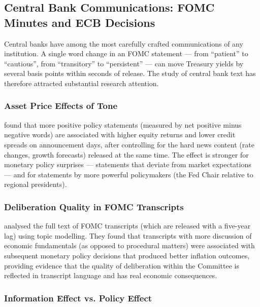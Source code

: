 \subsection{Central Bank Communications: FOMC Minutes and ECB Decisions}
\label{sec:ch09-central-bank-communications}

Central banks have among the most carefully crafted communications of any institution. A single word change in an FOMC statement --- from ``patient'' to ``cautious'', from ``transitory'' to ``persistent'' --- can move Treasury yields by several basis points within seconds of release. The study of central bank text has therefore attracted substantial research attention.

\subsubsection*{Asset Price Effects of Tone}

\citet{schmeling2019does} found that more positive policy statements (measured by net positive minus negative words) are associated with higher equity returns and lower credit spreads on announcement days, after controlling for the hard news content (rate changes, growth forecasts) released at the same time. The effect is stronger for monetary policy surprises --- statements that deviate from market expectations --- and for statements by more powerful policymakers (the Fed Chair relative to regional presidents).

\subsubsection*{Deliberation Quality in FOMC Transcripts}

\citet{hansen2018transparency} analysed the full text of FOMC transcripts (which are released with a five-year lag) using topic modelling. They found that transcripts with more discussion of economic fundamentals (as opposed to procedural matters) were associated with subsequent monetary policy decisions that produced better inflation outcomes, providing evidence that the quality of deliberation within the Committee is reflected in transcript language and has real economic consequences.

\subsubsection*{Information Effect vs. Policy Effect}


